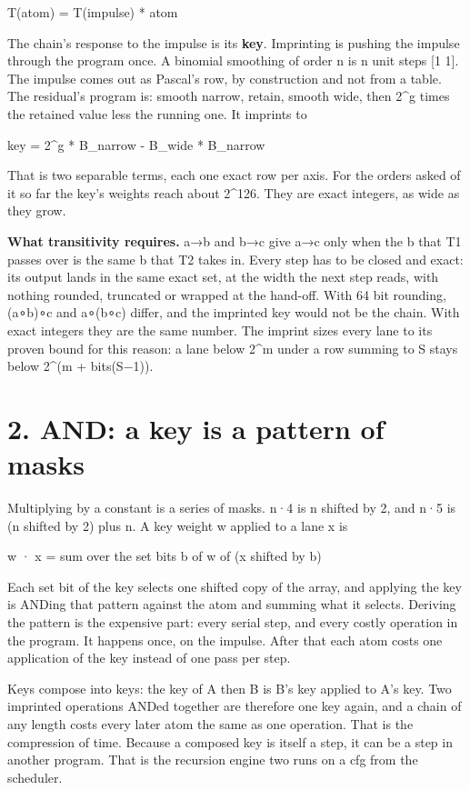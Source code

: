 T(atom) = T(impulse) * atom

The chain's response to the impulse is its \textbf{key}. Imprinting is pushing the impulse through the program once. A binomial smoothing of order n is n unit steps [1 1]. The impulse comes out as Pascal's row, by construction and not from a table. The residual's program is: smooth narrow, retain, smooth wide, then 2\textasciicircum{}g times the retained value less the running one. It imprints to

key = 2\textasciicircum{}g * B\_\allowbreak{}narrow  -  B\_\allowbreak{}wide * B\_\allowbreak{}narrow

That is two separable terms, each one exact row per axis. For the orders asked of it so far the key's weights reach about 2\textasciicircum{}126. They are exact integers, as wide as they grow.

\textbf{What transitivity requires.} a→b and b→c give a→c only when the b that T1 passes over is the same b that T2 takes in. Every step has to be closed and exact: its output lands in the same exact set, at the width the next step reads, with nothing rounded, truncated or wrapped at the hand-off. With 64 bit rounding, (a∘b)∘c and a∘(b∘c) differ, and the imprinted key would not be the chain. With exact integers they are the same number. The imprint sizes every lane to its proven bound for this reason: a lane below 2\textasciicircum{}m under a row summing to S stays below 2\textasciicircum{}(m + bits(S−1)).

\section{\texorpdfstring{2. AND: a key is a pattern of masks}{2. AND: a key is a pattern of masks}}

Multiplying by a constant is a series of masks. n·4 is n shifted by 2, and n·5 is (n shifted by 2) plus n. A key weight w applied to a lane x is

w · x = sum over the set bits b of w of (x shifted by b)

Each set bit of the key selects one shifted copy of the array, and applying the key is ANDing that pattern against the atom and summing what it selects. Deriving the pattern is the expensive part: every serial step, and every costly operation in the program. It happens once, on the impulse. After that each atom costs one application of the key instead of one pass per step.

Keys compose into keys: the key of A then B is B's key applied to A's key. Two imprinted operations ANDed together are therefore one key again, and a chain of any length costs every later atom the same as one operation. That is the compression of time. Because a composed key is itself a step, it can be a step in another program. That is the recursion engine two runs on a cfg from the scheduler.

